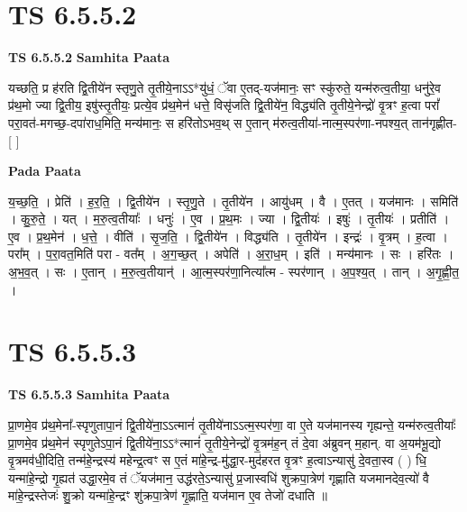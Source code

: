 \documentclass[17pt]{extarticle}
\begin{document}

\section{ TS 6.5.5.2 }

\textbf{TS 6.5.5.2 } \newline
\textbf{Samhita Paata} \newline

यच्छति॒ प्र ह॑रति द्वि॒तीये॑न स्तृणु॒ते तृ॒तीये॒नाऽऽ*यु॑धं॒ ॅवा ए॒तद्-यज॑मानः॒ सꣳ स्कु॑रुते॒ यन्म॑रुत्व॒तीया॒ धनु॑रे॒व प्र॑थ॒मो ज्या द्वि॒तीय॒ इषु॑स्तृ॒तीयः॒ प्रत्ये॒व प्र॑थ॒मेन॑ धत्ते॒ विसृ॑जति द्वि॒तीये॑न॒ विद्ध्य॑ति तृ॒तीये॒नेन्द्रो॑ वृ॒त्रꣳ ह॒त्वा परां᳚ परा॒वत॑-मगच्छ॒-दपा॑राध॒मिति॒ मन्य॑मानः॒ स हरि॑तोऽभव॒थ् स ए॒तान् म॑रुत्व॒तीया॑-नात्म॒स्पर॑णा-नपश्य॒त् तान॑गृह्णीत- [  ] \newline

\textbf{Pada Paata} \newline

य॒च्छ॒ति॒ । प्रेति॑ । ह॒र॒ति॒ । द्वि॒तीये॑न । स्तृ॒णु॒ते । तृ॒तीये॑न । आयु॑धम् । वै । ए॒तत् । यज॑मानः । समिति॑ । कु॒रु॒ते॒ । यत् । म॒रु॒त्व॒तीयाः᳚ । धनुः॑ । ए॒व । प्र॒थ॒मः । ज्या । द्वि॒तीयः॑ । इषुः॑ । तृ॒तीयः॑ । प्रतीति॑ । ए॒व । प्र॒थ॒मेन॑ । ध॒त्ते॒ । वीति॑ । सृ॒ज॒ति॒ । द्वि॒तीये॑न । विद्ध्य॑ति । तृ॒तीये॑न । इन्द्रः॑ । वृ॒त्रम् । ह॒त्वा । परा᳚म् । प॒रा॒वत॒मिति॑ परा - वत᳚म् । अ॒ग॒च्छ॒त् । अपेति॑ । अ॒रा॒ध॒म् । इति॑ । मन्य॑मानः । सः । हरि॑तः । अ॒भ॒व॒त् । सः । ए॒तान् । म॒रु॒त्व॒तीयान्॑ । आ॒त्म॒स्पर॑णा॒नित्या᳚त्म - स्पर॑णान् । अ॒प॒श्य॒त् । तान् । अ॒गृ॒ह्णी॒त॒ ।  \newline





\section{ TS 6.5.5.3 }

\textbf{TS 6.5.5.3 } \newline
\textbf{Samhita Paata} \newline

प्रा॒णमे॒व प्र॑थ॒मेना᳚-स्पृणुतापा॒नं द्वि॒तीये॑ना॒ऽऽत्मानं॑ तृ॒तीये॑नाऽऽत्म॒स्पर॑णा॒ वा ए॒ते यज॑मानस्य गृह्यन्ते॒ यन्म॑रुत्व॒तीयाः᳚ प्रा॒णमे॒व प्र॑थ॒मेन॑ स्पृणुतेऽपा॒नं द्वि॒तीये॑ना॒ऽऽ*त्मानं॑ तृ॒तीये॒नेन्द्रो॑ वृ॒त्रम॑ह॒न् तं दे॒वा अ॑ब्रुवन् म॒हान्. वा अ॒यम॑भू॒द्यो वृ॒त्रमव॑धी॒दिति॒ तन्म॑हे॒न्द्रस्य॑ महेन्द्र॒त्वꣳ स ए॒तं मा॑हे॒न्द्र-मु॑द्धा॒र-मुद॑हरत वृ॒त्रꣳ ह॒त्वाऽन्यासु॑ दे॒वता॒स्व ( ) धि॒ यन्मा॑हे॒न्द्रो गृ॒ह्यत॑ उद्धा॒रमे॒व तं ॅयज॑मान॒ उद्ध॑रते॒ऽन्यासु॑ प्र॒जास्वधि॑ शुक्रपा॒त्रेण॑ गृह्णाति यजमानदेव॒त्यो॑ वै मा॑हे॒न्द्रस्तेजः॑ शु॒क्रो यन्मा॑हे॒न्द्रꣳ शु॑क्रपा॒त्रेण॑ गृ॒ह्णाति॒ यज॑मान ए॒व तेजो॑ दधाति ॥ \newline
\end{document}
